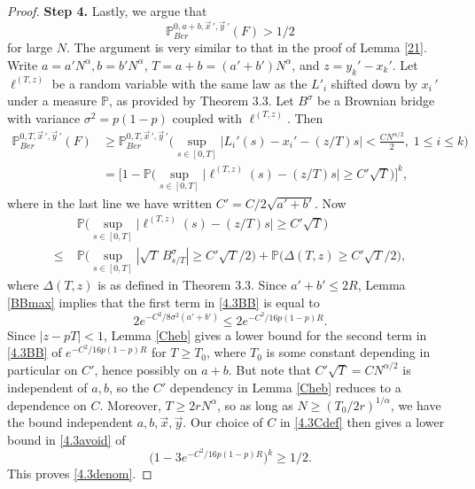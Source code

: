 \begin{proof}
		\noindent\textbf{Step 4.} Lastly, we argue that
		\begin{equation}\label{4.3denom}
		\mathbb{P}^{0, a+b, \vec{x}\,', \vec{y}\,'}_{Ber}(F) > 1/2
		\end{equation}
		for large $N$. The argument is very similar to that in the proof of Lemma \ref{21}. Write $a = a'N^\alpha, b = b'N^\alpha$, $T = a+b = (a'+b')N^\alpha$, and $z = y_k' - x_k'$. Let $\ell^{(T,z)}$ be a random variable with the same law as the $L'_i$ shifted down by $x_i\,'$ under a measure $\mathbb{P}$, as provided by Theorem 3.3. Let $B^{\sigma}$ be a Brownian bridge with variance $\sigma^2 = p(1-p)$ coupled with $\ell^{(T,z)}$. Then
		\begin{align}
		\mathbb{P}^{0,T,\vec{x}\,', \vec{y}\,'}_{Ber}(F) &\geq \mathbb{P}^{0,T,\vec{x}\,', \vec{y}\,'}_{Ber} \Big( \sup_{s\in[0,T]} \Big|L_i'(s) - x_i' - (z/T)s\Big| < \frac{CN^{\alpha/2}}{2},\; 1\leq i\leq k \Big)\nonumber\\
		&= \Big[ 1 - \mathbb{P} \Big( \sup_{s\in[0,T]} \Big|\ell^{(T,z)}(s) - (z/T)s\Big| \geq C'\sqrt{T} \Big) \Big]^k,\label{4.3avoid}
		\end{align}
		where in the last line we have written $C' = C/2\sqrt{a'+b'}$. Now
		\begin{align}
		&\mathbb{P} \Big( \sup_{s\in[0,T]} \Big|\ell^{(T,z)}(s) - (z/T)s\Big| \geq C'\sqrt{T} \Big) \nonumber\\
		\leq \; & \mathbb{P} \Big( \sup_{s\in[0,T]} |\sqrt{T}\,B^{\sigma}_{s/T}| \geq C'\sqrt{T}/2\Big) + \mathbb{P} \Big( \Delta(T,z) \geq C'\sqrt{T}/2 \Big), \label{4.3BB}
		\end{align}
		where $\Delta(T,z)$ is as defined in Theorem 3.3. Since $a' + b' \leq 2R$, Lemma \ref{BBmax} implies that the first term in \eqref{4.3BB} is equal to
		\[
		2e^{-C^2/8\sigma^2(a'+b')} \leq 2e^{-C^2/16p(1-p)R}.
		\]
		Since $|z-pT| < 1$, Lemma \ref{Cheb} gives a lower bound for the second term in \eqref{4.3BB} of $e^{-C^2/16p(1-p)R}$ for $T\geq T_0$, where $T_0$ is some constant depending in particular on $C'$, hence possibly on $a+b$. But note that $C'\sqrt{T} = CN^{\alpha/2}$ is independent of $a,b$, so the $C'$ dependency in Lemma \ref{Cheb} reduces to a dependence on $C$. Moreover, $T\geq 2rN^\alpha$, so as long as $N \geq (T_0/2r)^{1/\alpha}$, we have the bound independent $a,b,\vec{x},\vec{y}$. Our choice of $C$ in \eqref{4.3Cdef} then gives a lower bound in \eqref{4.3avoid} of
		\[
		\big(1 - 3e^{-C^2/16p(1-p)R}\big)^k \geq 1/2.
		\]
		This proves \eqref{4.3denom}.
		
	\end{proof}
	
